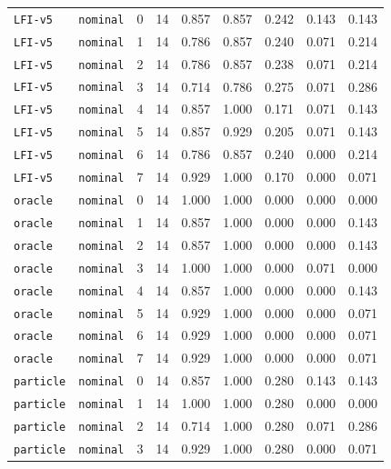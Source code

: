 \documentclass{article}
\begin{document}
\begin{center}
{\begin{tabular}{llllccccc}
\texttt{LFI-v5} & \texttt{nominal} & 0 & 14 & 0.857 & 0.857 & 0.242 & 0.143 & 0.143 \\
\texttt{LFI-v5} & \texttt{nominal} & 1 & 14 & 0.786 & 0.857 & 0.240 & 0.071 & 0.214 \\
\texttt{LFI-v5} & \texttt{nominal} & 2 & 14 & 0.786 & 0.857 & 0.238 & 0.071 & 0.214 \\
\texttt{LFI-v5} & \texttt{nominal} & 3 & 14 & 0.714 & 0.786 & 0.275 & 0.071 & 0.286 \\
\texttt{LFI-v5} & \texttt{nominal} & 4 & 14 & 0.857 & 1.000 & 0.171 & 0.071 & 0.143 \\
\texttt{LFI-v5} & \texttt{nominal} & 5 & 14 & 0.857 & 0.929 & 0.205 & 0.071 & 0.143 \\
\texttt{LFI-v5} & \texttt{nominal} & 6 & 14 & 0.786 & 0.857 & 0.240 & 0.000 & 0.214 \\
\texttt{LFI-v5} & \texttt{nominal} & 7 & 14 & 0.929 & 1.000 & 0.170 & 0.000 & 0.071 \\
\texttt{oracle} & \texttt{nominal} & 0 & 14 & 1.000 & 1.000 & 0.000 & 0.000 & 0.000 \\
\texttt{oracle} & \texttt{nominal} & 1 & 14 & 0.857 & 1.000 & 0.000 & 0.000 & 0.143 \\
\texttt{oracle} & \texttt{nominal} & 2 & 14 & 0.857 & 1.000 & 0.000 & 0.000 & 0.143 \\
\texttt{oracle} & \texttt{nominal} & 3 & 14 & 1.000 & 1.000 & 0.000 & 0.071 & 0.000 \\
\texttt{oracle} & \texttt{nominal} & 4 & 14 & 0.857 & 1.000 & 0.000 & 0.000 & 0.143 \\
\texttt{oracle} & \texttt{nominal} & 5 & 14 & 0.929 & 1.000 & 0.000 & 0.000 & 0.071 \\
\texttt{oracle} & \texttt{nominal} & 6 & 14 & 0.929 & 1.000 & 0.000 & 0.000 & 0.071 \\
\texttt{oracle} & \texttt{nominal} & 7 & 14 & 0.929 & 1.000 & 0.000 & 0.000 & 0.071 \\
\texttt{particle} & \texttt{nominal} & 0 & 14 & 0.857 & 1.000 & 0.280 & 0.143 & 0.143 \\
\texttt{particle} & \texttt{nominal} & 1 & 14 & 1.000 & 1.000 & 0.280 & 0.000 & 0.000 \\
\texttt{particle} & \texttt{nominal} & 2 & 14 & 0.714 & 1.000 & 0.280 & 0.071 & 0.286 \\
\texttt{particle} & \texttt{nominal} & 3 & 14 & 0.929 & 1.000 & 0.280 & 0.000 & 0.071 \\
\bottomrule
\end{tabular}%
}
\end{center}
\end{document}
